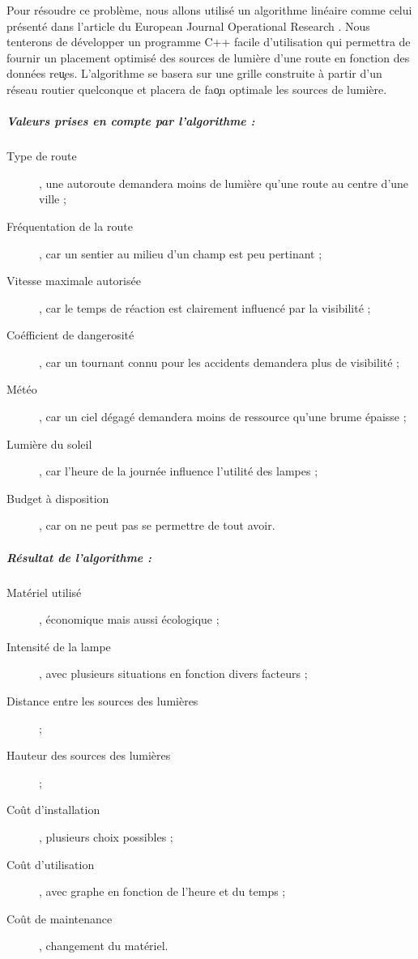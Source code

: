 Pour r\'esoudre ce probl\`eme, nous allons utilis\'e un algorithme lin\'eaire comme celui pr\'esent\'e dans l'article du European Journal Operational Research \cite{mainref}. Nous tenterons de d\'evelopper un programme C++ facile d'utilisation qui permettra de fournir un placement optimis\'e des sources de lumi\`ere d'une route en fonction des donn\'ees re\c ues. L'algorithme se basera sur une grille construite \`a partir d'un r\'eseau routier quelconque et placera de fa\c on optimale les sources de lumi\`ere.

\subparagraph{Valeurs prises en compte par l'algorithme :}
\begin{description}
	\item [Type de route], une autoroute demandera moins de lumi\`ere qu'une route au centre d'une ville ;
    \item [Fr\'equentation de la route], car un sentier au milieu d'un champ est peu pertinant ;
    \item [Vitesse maximale autoris\'ee], car le temps de r\'eaction est clairement influenc\'e par la visibilit\'e ;
    \item [Co\'efficient de dangerosit\'e], car un tournant connu pour les accidents demandera plus de visibilit\'e ;
    \item [M\'et\'eo], car un ciel d\'egag\'e demandera moins de ressource qu'une brume \'epaisse ;
    \item [Lumi\`ere du soleil], car l'heure de la journ\'ee influence l'utilit\'e des lampes ;
    \item [Budget \`a disposition], car on ne peut pas se permettre de tout avoir.
\end{description}

\subparagraph{R\'esultat de l'algorithme :}
\begin{description}
    \item [Mat\'eriel utilis\'e], \'economique mais aussi \'ecologique ;
    \item [Intensit\'e de la lampe], avec plusieurs situations en fonction divers facteurs ;
    \item [Distance entre les sources des lumi\`eres] ;
    \item [Hauteur des sources des lumi\`eres] ;
    \item [Co\^ut d'installation], plusieurs choix possibles ;
    \item [Co\^ut d'utilisation], avec graphe en fonction de l'heure et du temps ;
    \item [Co\^ut de maintenance], changement du mat\'eriel.
\end{description}